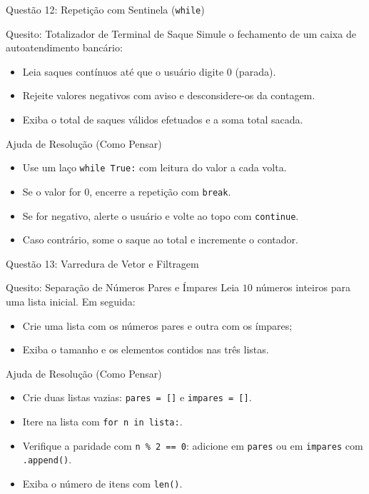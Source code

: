 \begin{frame}{Questão 12: Repetição com Sentinela (\texttt{while})}
    \begin{block}{Quesito: Totalizador de Terminal de Saque}
        Simule o fechamento de um caixa de autoatendimento bancário:
        \begin{itemize}
            \item Leia saques contínuos até que o usuário digite $0$ (parada).
            \item Rejeite valores negativos com aviso e desconsidere-os da contagem.
            \item Exiba o total de saques válidos efetuados e a soma total sacada.
        \end{itemize}
    \end{block}

    \begin{exampleblock}{Ajuda de Resolução (Como Pensar)}
        \begin{itemize}
            \item Use um laço \texttt{while True:} com leitura do valor a cada volta.
            \item Se o valor for $0$, encerre a repetição com \texttt{break}.
            \item Se for negativo, alerte o usuário e volte ao topo com \texttt{continue}.
            \item Caso contrário, some o saque ao total e incremente o contador.
        \end{itemize}
    \end{exampleblock}
\end{frame}

\begin{frame}{Questão 13: Varredura de Vetor e Filtragem}
    \begin{block}{Quesito: Separação de Números Pares e Ímpares}
        Leia $10$ números inteiros para uma lista inicial. Em seguida:
        \begin{itemize}
            \item Crie uma lista com os números pares e outra com os ímpares;
            \item Exiba o tamanho e os elementos contidos nas três listas.
        \end{itemize}
    \end{block}

    \begin{exampleblock}{Ajuda de Resolução (Como Pensar)}
        \begin{itemize}
            \item Crie duas listas vazias: \texttt{pares = []} e \texttt{impares = []}.
            \item Itere na lista com \texttt{for n in lista:}.
            \item Verifique a paridade com \texttt{n \% 2 == 0}: adicione em \texttt{pares} ou em \texttt{impares} com \texttt{.append()}.
            \item Exiba o número de itens com \texttt{len()}.
        \end{itemize}
    \end{exampleblock}
\end{frame}

